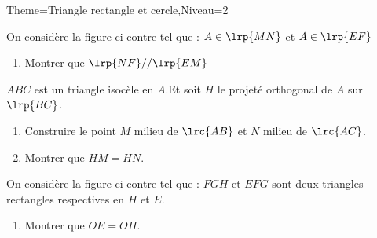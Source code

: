\documentclass[a4paper,12pt]{article}
\begin{document}
\begin{Maquette}[Fiche]{Theme=Triangle rectangle et cercle,Niveau=2}
\begin{exercice}
\begin{minipage}{0.5\linewidth}
On considère la figure ci-contre tel que : \newline
$A\in \lrp{MN}$ et $A\in \lrp{EF}$
\begin{enumerate}
\item Montrer que $\lrp{NF}//\lrp{EM}$
\end{enumerate}
\end{minipage}%
\begin{minipage}{0.5\linewidth}
\end{minipage}
\end{exercice}

\begin{exercice}
$ABC$ est un triangle isocèle en $A$.Et soit $H$ le projeté orthogonal de $A$ sur $\lrp{BC}$.
\begin{enumerate}
\item Construire le point $M$ milieu de $\lrc{AB}$ et $N$ milieu de $\lrc{AC}$.
\item Montrer que $HM=HN$.
\end{enumerate}
\end{exercice}

\begin{exercice}
\begin{minipage}{0.65\linewidth}
On considère la figure ci-contre tel que : $FGH$ et $EFG$ sont deux triangles rectangles respectives en $H$ et $E$.
\begin{enumerate}
\item Montrer que $OE=OH$.
\end{enumerate}
\end{minipage}%
\begin{minipage}{0.35\linewidth}
\end{minipage}
\end{exercice}


\end{Maquette}
\end{document}
